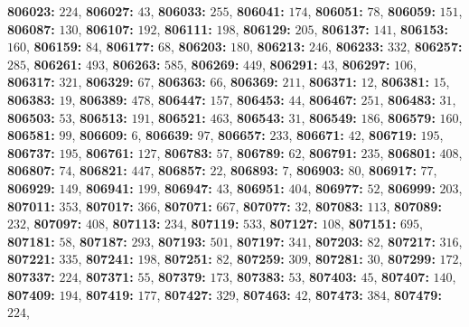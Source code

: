 \textsf{\bfseries 806023:} $224$, \textsf{\bfseries 806027:} $43$, \textsf{\bfseries 806033:} $255$, \textsf{\bfseries 806041:} $174$, \textsf{\bfseries 806051:} $78$, \textsf{\bfseries 806059:} $151$, \textsf{\bfseries 806087:} $130$, \textsf{\bfseries 806107:} $192$, \textsf{\bfseries 806111:} $198$, \textsf{\bfseries 806129:} $205$, \textsf{\bfseries 806137:} $141$, \textsf{\bfseries 806153:} $160$, \textsf{\bfseries 806159:} $84$, \textsf{\bfseries 806177:} $68$, \textsf{\bfseries 806203:} $180$, \textsf{\bfseries 806213:} $246$, \textsf{\bfseries 806233:} $332$, \textsf{\bfseries 806257:} $285$, \textsf{\bfseries 806261:} $493$, \textsf{\bfseries 806263:} $585$, \textsf{\bfseries 806269:} $449$, \textsf{\bfseries 806291:} $43$, \textsf{\bfseries 806297:} $106$, \textsf{\bfseries 806317:} $321$, \textsf{\bfseries 806329:} $67$, \textsf{\bfseries 806363:} $66$, \textsf{\bfseries 806369:} $211$, \textsf{\bfseries 806371:} $12$, \textsf{\bfseries 806381:} $15$, \textsf{\bfseries 806383:} $19$, \textsf{\bfseries 806389:} $478$, \textsf{\bfseries 806447:} $157$, \textsf{\bfseries 806453:} $44$, \textsf{\bfseries 806467:} $251$, \textsf{\bfseries 806483:} $31$, \textsf{\bfseries 806503:} $53$, \textsf{\bfseries 806513:} $191$, \textsf{\bfseries 806521:} $463$, \textsf{\bfseries 806543:} $31$, \textsf{\bfseries 806549:} $186$, \textsf{\bfseries 806579:} $160$, \textsf{\bfseries 806581:} $99$, \textsf{\bfseries 806609:} $6$, \textsf{\bfseries 806639:} $97$, \textsf{\bfseries 806657:} $233$, \textsf{\bfseries 806671:} $42$, \textsf{\bfseries 806719:} $195$, \textsf{\bfseries 806737:} $195$, \textsf{\bfseries 806761:} $127$, \textsf{\bfseries 806783:} $57$, \textsf{\bfseries 806789:} $62$, \textsf{\bfseries 806791:} $235$, \textsf{\bfseries 806801:} $408$, \textsf{\bfseries 806807:} $74$, \textsf{\bfseries 806821:} $447$, \textsf{\bfseries 806857:} $22$, \textsf{\bfseries 806893:} $7$, \textsf{\bfseries 806903:} $80$, \textsf{\bfseries 806917:} $77$, \textsf{\bfseries 806929:} $149$, \textsf{\bfseries 806941:} $199$, \textsf{\bfseries 806947:} $43$, \textsf{\bfseries 806951:} $404$, \textsf{\bfseries 806977:} $52$, \textsf{\bfseries 806999:} $203$, \textsf{\bfseries 807011:} $353$, \textsf{\bfseries 807017:} $366$, \textsf{\bfseries 807071:} $667$, \textsf{\bfseries 807077:} $32$, \textsf{\bfseries 807083:} $113$, \textsf{\bfseries 807089:} $232$, \textsf{\bfseries 807097:} $408$, \textsf{\bfseries 807113:} $234$, \textsf{\bfseries 807119:} $533$, \textsf{\bfseries 807127:} $108$, \textsf{\bfseries 807151:} $695$, \textsf{\bfseries 807181:} $58$, \textsf{\bfseries 807187:} $293$, \textsf{\bfseries 807193:} $501$, \textsf{\bfseries 807197:} $341$, \textsf{\bfseries 807203:} $82$, \textsf{\bfseries 807217:} $316$, \textsf{\bfseries 807221:} $335$, \textsf{\bfseries 807241:} $198$, \textsf{\bfseries 807251:} $82$, \textsf{\bfseries 807259:} $309$, \textsf{\bfseries 807281:} $30$, \textsf{\bfseries 807299:} $172$, \textsf{\bfseries 807337:} $224$, \textsf{\bfseries 807371:} $55$, \textsf{\bfseries 807379:} $173$, \textsf{\bfseries 807383:} $53$, \textsf{\bfseries 807403:} $45$, \textsf{\bfseries 807407:} $140$, \textsf{\bfseries 807409:} $194$, \textsf{\bfseries 807419:} $177$, \textsf{\bfseries 807427:} $329$, \textsf{\bfseries 807463:} $42$, \textsf{\bfseries 807473:} $384$, \textsf{\bfseries 807479:} $224$, 
